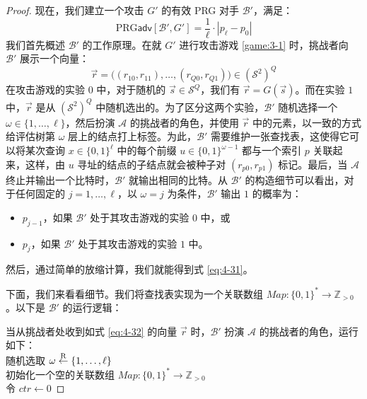 \begin{proof}
现在，我们建立一个攻击 $G'$ 的有效 PRG 对手 $\mathcal{B}'$，满足：
\begin{equation}\label{eq:4-31}
\mathrm{PRG}\mathsf{adv}[\mathcal{B}',G']
=\frac{1}{\ell}\cdot|p_\ell-p_0|
\end{equation}
我们首先概述 $\mathcal{B}'$ 的工作原理。在就 $G'$ 进行攻击游戏 \ref{game:3-1} 时，挑战者向 $\mathcal{B}'$ 展示一个向量：
\begin{equation}\label{eq:4-32}
\vec{r}=\big((r_{10},r_{11}),\dots,(r_{Q0},r_{Q1})\big)\in(\mathcal{S}^2)^Q
\end{equation}
在攻击游戏的实验 $0$ 中，对于随机的 $\vec{s}\in\mathcal{S}^Q$，我们有 $\vec{r}=G(\vec{s})$。而在实验 $1$ 中，$\vec{r}$ 是从 $(\mathcal{S}^2)^Q$ 中随机选出的。为了区分这两个实验，$\mathcal{B}'$ 随机选择一个 $\omega\in\{1,\dots,\ell\}$，然后扮演 $\mathcal{A}$ 的挑战者的角色，并使用 $\vec r$ 中的元素，以一致的方式给评估树第 $\omega$ 层上的结点打上标签。为此，$\mathcal{B}'$ 需要维护一张查找表，这使得它可以将某次查询 $x\in\{0,1\}^\ell$ 中的每个前缀 $u\in\{0,1\}^{\omega-1}$ 都与一个索引 $p$ 关联起来，这样，由 $u$ 寻址的结点的子结点就会被种子对 $(r_{p0},r_{p1})$ 标记。最后，当 $\mathcal{A}$ 终止并输出一个比特时，$\mathcal{B}'$ 就输出相同的比特。从 $\mathcal{B}'$ 的构造细节可以看出，对于任何固定的 $j=1,\dots,\ell$，以 $\omega=j$ 为条件，$\mathcal{B}'$ 输出 $1$ 的概率为：
\begin{itemize}
	\item $p_{j-1}$，如果 $\mathcal{B}'$ 处于其攻击游戏的实验 $0$ 中，或
	\item $p_j$，如果 $\mathcal{B}'$ 处于其攻击游戏的实验 $1$ 中。
\end{itemize}
然后，通过简单的放缩计算，我们就能得到式 \ref{eq:4-31}。

下面，我们来看看细节。我们将查找表实现为一个关联数组 $\mathit{Map}:\{0,1\}^*\to\mathbb{Z}_{>0}$。以下是 $\mathcal{B}'$ 的运行逻辑：

\vspace{10pt}

\hspace*{5pt} 当从挑战者处收到如式 \ref{eq:4-32} 的向量 $\vec r$ 时，$\mathcal{B}'$ 扮演 $\mathcal{A}$ 的挑战者的角色，运行如下：\\
\hspace*{50pt} 随机选取 $\omega\overset{\rm R}\leftarrow\{1,\dots,\ell\}$\\
\hspace*{50pt} 初始化一个空的关联数组 $\mathit{Map}:\{0,1\}^*\to\mathbb{Z}_{>0}$\\
\hspace*{50pt} 令 $\mathit{ctr}\leftarrow 0$


\end{proof}
